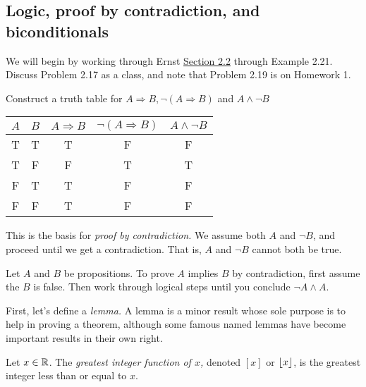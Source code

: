 \documentclass{../ximera}
\begin{document}
\subsection{Logic, proof by contradiction, and biconditionals}%

We will begin by working through Ernst \href{https://danaernst.com/IBL-IntroToProof/pretext/sec_Intro_to_Logic.html}{Section 2.2} through Example 2.21. Discuss Problem 2.17 as a class, and note that Problem 2.19 is on Homework 1.



\begin{br}
  Construct a truth table for $A\Rightarrow B, \neg (A\Rightarrow B)$ and $A\land \neg B$

  \begin{solution}
 
    \begin{tabular}{c|c|c|c|c}
      $A$ 	& $B$	& $A\Rightarrow B$ 	& $\neg (A\Rightarrow B)$ & $A\land \neg B$\\\hline
      T 	& T		& T 				& F					& F	\\
      T 	& F 		& F 				& T					& T\\
      F 	& T 		& T 				& F					& F\\
      F 	& F 		& T 				& F					& F\\
    \end{tabular}
  \end{solution}
\end{br}
This is the basis for \emph{proof by contradiction.} We assume both $A$ and $\neg B$, and proceed until we get a contradiction. That is, $A$ and $\neg B$ cannot both be true.

\begin{defn}\label{proof-contradiction}
  Let $A$ and $B$ be propositions. To prove $A$ implies $B$ by contradiction, first assume the $B$ is false. Then work through logical steps until you conclude $\neg A \land A$.
\end{defn}

First, let's define a \emph{lemma.} A lemma is a minor result whose sole purpose is to help in proving a theorem, although some famous named lemmas have become important results in their own right.

\begin{defn}\label{defn:floor}
  Let $x\in\mathbb R$. The \emph{greatest integer function of $x$,} denoted $[x]$ or $\left\lfloor x\right\rfloor$, is the greatest integer less than or equal to $x$.
\end{defn}
\end{document}
